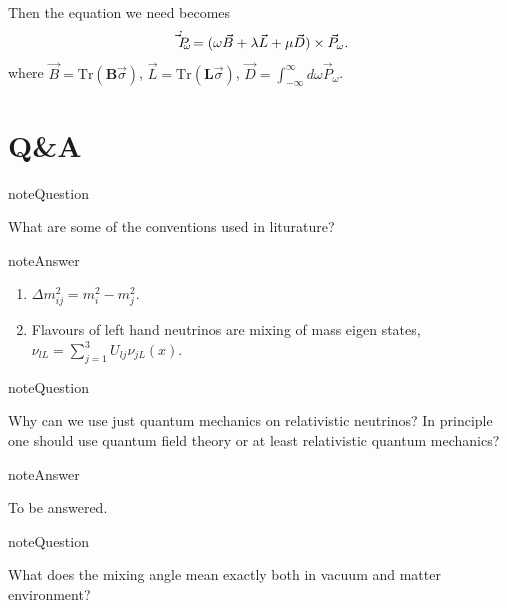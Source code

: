 \documentclass[letterpaper,12pt,english]{sphinxmanual}
\begin{document}
Then the equation we need becomes
\begin{gather}
\begin{split}\dot{\vec P_\omega} = (\omega \vec B + \lambda \vec L + \mu \vec D) \times \vec P_{\omega}.\end{split}\notag
\end{gather}
where \(\vec B = \mathrm {Tr}(\mathbf B \vec \sigma)\), \(\vec L = \mathrm{Tr}(\mathbf L \vec \sigma)\), \(\vec D = \int_{-\infty}^{\infty}d\omega \vec P_\omega\).


\section{Q\&A}
\label{oscillations:q-a}
\begin{notice}{note}{Question}

What are some of the conventions used in liturature?
\end{notice}

\begin{notice}{note}{Answer}
\begin{enumerate}
\item {} 
\(\Delta m^2_{ij}=m_i^2-m_j^2\).

\item {} 
Flavours of left hand neutrinos are mixing of mass eigen states, \(\nu_{lL}=\sum_{j=1}^3 U_{lj}\nu_{jL}(x)\).

\end{enumerate}
\end{notice}

\begin{notice}{note}{Question}

Why can we use just quantum mechanics on relativistic neutrinos? In principle one should use quantum field theory or at least relativistic quantum mechanics?
\end{notice}

\begin{notice}{note}{Answer}

To be answered.
\end{notice}

\begin{notice}{note}{Question}

What does the mixing angle mean exactly both in vacuum and matter environment?
\end{notice}
\end{document}
